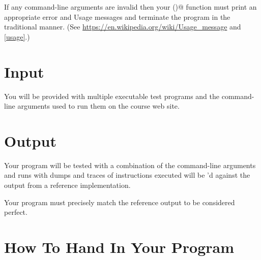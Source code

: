 \documentclass{article}
\begin{document}
If any command-line arguments are invalid then your \verb@usage()@ function must print an 
appropriate error and Usage messages and terminate the program in the traditional manner. 
(See \url{https://en.wikipedia.org/wiki/Usage_message} and \autoref{usage}.)

\begin{figure}[ht]
\centering
{}
\label{usage}
\end{figure}








\section{Input}
\label{section:input}

You will be provided with multiple executable test programs and the
command-line arguments used to run them on the course web site.


\section{Output}

Your program will be tested with a combination of the command-line arguments
and runs with dumps and traces of instructions executed will be \verb@diff@'d
against the output from a reference implementation.

Your program must precisely match the reference output to be considered perfect.


\section{How To Hand In Your Program}
\end{document}
